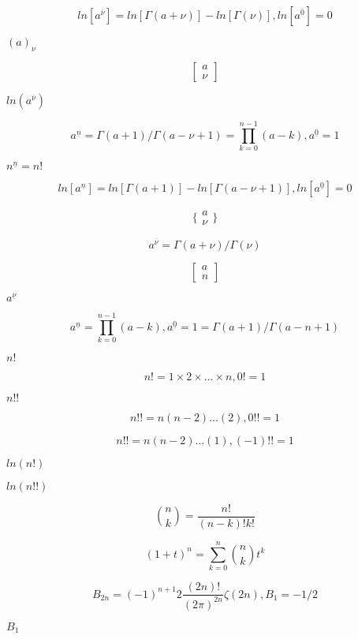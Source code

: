 \documentclass{article}
\begin{document}
\[ ln[a^{\overline{\nu}}] = ln[\Gamma(a + \nu)] - ln[\Gamma(\nu)], ln[a^{\overline{0}}] = 0 \]
\pagebreak

$ (a)_\nu $
\pagebreak

\[ \left[ \begin{array}{c} a \\ \nu \end{array} \right] \]
\pagebreak

$ ln(a^{\overline{\nu}})$
\pagebreak

\[ a^{\underline{n}} = \Gamma(a + 1) / \Gamma(a - \nu + 1) = \prod_{k=0}^{n-1} (a - k), a^{\underline{0}} = 1 \]
\pagebreak

$ n^{\underline{n}} = n! $
\pagebreak

\[ ln[a^{\underline{n}}] = ln[\Gamma(a + 1)] - ln[\Gamma(a - \nu + 1)], ln[a^{\underline{0}}] = 0 \]
\pagebreak

\[ \{ \begin{array}{c} a \\ \nu \end{array} \} \]
\pagebreak

\[ a^{\overline{\nu}} = \Gamma(a + \nu) / \Gamma(\nu) \]
\pagebreak

\[ \left[ \begin{array}{c} a \\ n \end{array} \right] \]
\pagebreak

$ a^{\underline{\nu}} $
\pagebreak

\[ a^{\underline{n}} = \prod_{k=0}^{n-1} (a - k), a^{\underline{0}} = 1 = \Gamma(a + 1) / \Gamma(a - n + 1) \]
\pagebreak

$ n! $
\pagebreak

\[ n! = 1 \times 2 \times ... \times n, 0! = 1 \]
\pagebreak

$ n!! $
\pagebreak

\[ n!! = n(n-2)...(2), 0!! = 1 \]
\pagebreak

\[ n!! = n(n-2)...(1), (-1)!! = 1 \]
\pagebreak

$ ln(n!) $
\pagebreak

$ ln(n!!) $
\pagebreak

\[ \binom{n}{k} = \frac{n!}{(n-k)! k!} \]
\pagebreak

\[ \left(1 + t\right)^n = \sum_{k=0}^n \binom{n}{k} t^k \]
\pagebreak

\[ B_{2n} = (-1)^{n+1} 2\frac{(2n)!}{(2\pi)^{2n}} \zeta(2n), B_1 = -1/2 \]
\pagebreak

$ B_1 $
\pagebreak
\end{document}
